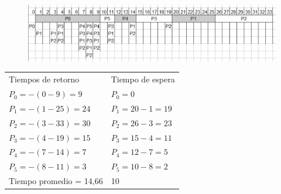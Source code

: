 \documentclass[a4paper]{article}
\begin{document}
\begin{figure}[!htb]
\includegraphics[scale=0.60]{SJF-noApropiativo.eps}
\end{figure}
\begin{tabular}{l l}
Tiempos de retorno & Tiempo de espera\\
$P_0 =-(0 - 9)= 9$   & $P_0 = 0$ \\
$P_1 =-(1 - 25)= 24$ & $P_1 = 20-1= 19$ \\
$P_2 =-(3 - 33)= 30$ & $P_2 = 26-3= 23$\\
$P_3 =-(4 - 19)= 15$ & $P_3 = 15-4= 11$\\
$P_4 =-(7 - 14)= 7$ & $P_4 = 12-7= 5$\\
$P_5 =-(8 - 11)= 3$ & $P_5 = 10-8= 2$\\
Tiempo promedio = 14,66 & 10
\end{tabular}
\end{document}
